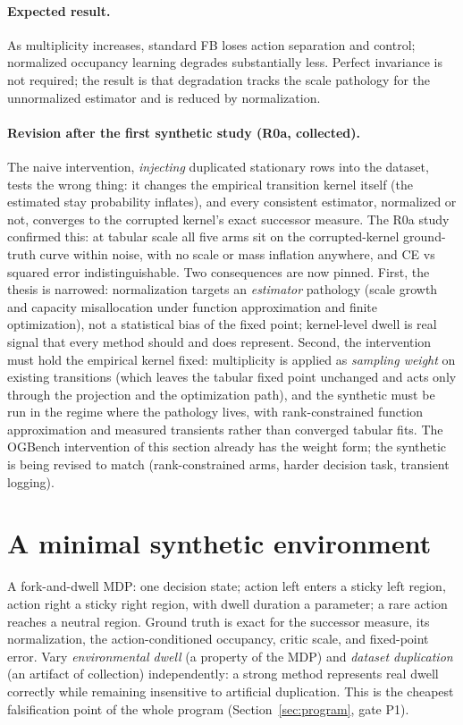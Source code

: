 \documentclass{article}
\begin{document}
\paragraph{Expected result.}
As multiplicity increases, standard FB loses action separation and control; normalized occupancy learning degrades substantially less.
Perfect invariance is not required; the result is that degradation tracks the scale pathology for the unnormalized estimator and is reduced by normalization.

\paragraph{Revision after the first synthetic study (R0a, collected).}
The naive intervention, \emph{injecting} duplicated stationary rows into the dataset, tests the wrong thing: it changes the empirical transition kernel itself (the estimated stay probability inflates), and every consistent estimator, normalized or not, converges to the corrupted kernel's exact successor measure.
The R0a study confirmed this: at tabular scale all five arms sit on the corrupted-kernel ground-truth curve within noise, with no scale or mass inflation anywhere, and CE vs squared error indistinguishable.
Two consequences are now pinned.
First, the thesis is narrowed: normalization targets an \emph{estimator} pathology (scale growth and capacity misallocation under function approximation and finite optimization), not a statistical bias of the fixed point; kernel-level dwell is real signal that every method should and does represent.
Second, the intervention must hold the empirical kernel fixed: multiplicity is applied as \emph{sampling weight} on existing transitions (which leaves the tabular fixed point unchanged and acts only through the projection and the optimization path), and the synthetic must be run in the regime where the pathology lives, with rank-constrained function approximation and measured transients rather than converged tabular fits.
The OGBench intervention of this section already has the weight form; the synthetic is being revised to match (rank-constrained arms, harder decision task, transient logging).

\section{A minimal synthetic environment}
\label{sec:synthetic}

A fork-and-dwell MDP: one decision state; action left enters a sticky left region, action right a sticky right region, with dwell duration a parameter; a rare action reaches a neutral region.
Ground truth is exact for the successor measure, its normalization, the action-conditioned occupancy, critic scale, and fixed-point error.
Vary \emph{environmental dwell} (a property of the MDP) and \emph{dataset duplication} (an artifact of collection) independently: a strong method represents real dwell correctly while remaining insensitive to artificial duplication.
This is the cheapest falsification point of the whole program (Section~\ref{sec:program}, gate P1).
\end{document}
